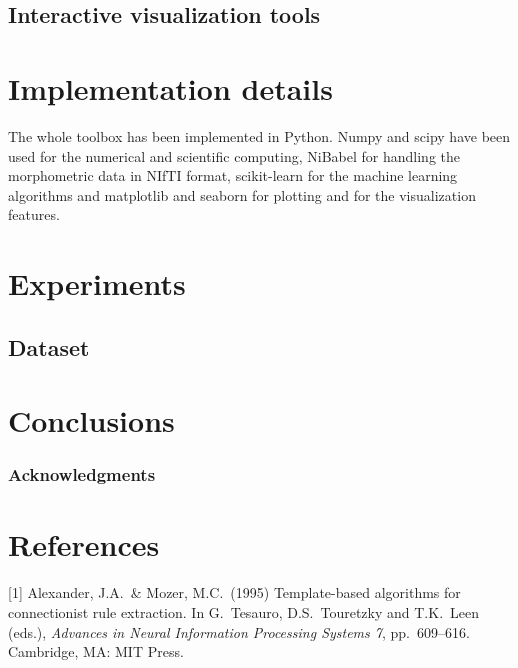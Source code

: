 \documentclass{article}
\begin{document}
\subsection{Interactive visualization tools}

\section{Implementation details}

The whole toolbox has been implemented in Python. Numpy and scipy have been used for the numerical and scientific computing, NiBabel for handling the morphometric data in NIfTI format, scikit-learn for the machine learning algorithms and matplotlib and seaborn for plotting and for the visualization features.

\section{Experiments}

\subsection{Dataset}

\section{Conclusions}

\subsubsection*{Acknowledgments}


\section*{References}
\small

[1] Alexander, J.A.\ \& Mozer, M.C.\ (1995) Template-based algorithms
for connectionist rule extraction. In G.\ Tesauro, D.S.\ Touretzky and
T.K.\ Leen (eds.), {\it Advances in Neural Information Processing
  Systems 7}, pp.\ 609--616. Cambridge, MA: MIT Press.
\end{document}
